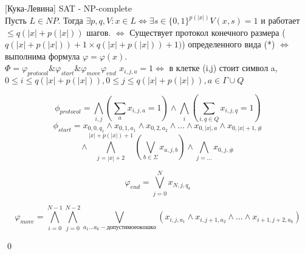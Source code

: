\documentclass{article}
\begin{document}
	\begin{theorem}{[Кука-Левина]}
		SAT - NP-complete
		\proof \\
		Пусть $L \in NP$. Тогда $\exists p,q,V: x \in L \Leftrightarrow \exists s \in \{0,1\}^{p(|x|)}  V(x,s)=1$ и работает  $\le q(|x| + p(|x|))$ шагов.
		$ \Leftrightarrow$ Существует протокол конечного размера ($q(|x| + p(|x|)) + 1 \times q(|x| + p(|x|)) + 1)$) определенного вида (*)
		$\Leftrightarrow$ выполнима формула $\varphi = \varphi(x)$.\\
		
		$\Phi = \varphi_{protocol} \& \varphi_{start} \& \varphi_{move} \varphi_{end}$
		$x_{i,j,a} = 1 \Leftrightarrow$ в клетке (i,j) стоит символ a,\\
		$0 \le i \le q(|x| + p(|x|)), 0 \le j \le q(|x| + p(|x|)), a \in \Gamma \cup Q$
		
		$$\phi_{protocol} = \bigwedge_{i,j} (\sum_a x_{i,j,a} = 1) \wedge \bigwedge_i (\sum_{i,q \in Q}x_{i,j,q} = 1)$$
		$$\phi_{start}=x_{0,0,q_1} \wedge x_{0,1,a_1} \wedge x_{0,2,a_2} \wedge \ldots \wedge x_{0, |x|, a} \wedge x_{0,|x| + 1, \#}$$
		$$\wedge \bigwedge_{j=|x| + 2}^{|x| + p(|x|) + 1}(\bigvee_{b \in \Sigma} x_{a,j,b}) \wedge \bigwedge_{j=\ldots}x_{0,j,\#}$$
		
		$$\varphi_{end} = \bigvee_{j=0}^N x_{N,j,q_a}$$
		
		$$\varphi_{move} = \bigwedge_{i=0}^{N-1}\bigwedge_{j=0}^{N-2}\bigvee_{a_1 \ldots a_6 - допустимое окошко} (x_{i,j,a_1} \wedge x_{i,j+1,a_2} \wedge \ldots \wedge x_{i+1, j+2, a_6})$$
	\end{theorem}
	\qed
\end{document}
